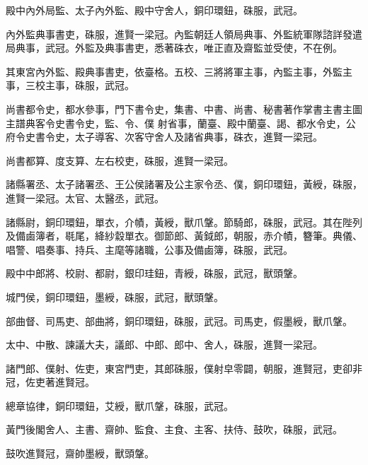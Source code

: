 \begin{pinyinscope}
 殿中內外局監、太子內外監、殿中守舍人，銅印環鈕，硃服，武冠。



 內外監典事書吏，硃服，進賢一梁冠。內監朝廷人領局典事、外監統軍隊諮詳發遣局典事，武冠。外監及典事書吏，悉著硃衣，唯正直及齋監並受使，不在例。



 其東宮內外監、殿典事書吏，依臺格。五校、三將將軍主事，內監主事，外監主事，三校主事，硃服，武冠。



 尚書都令史，都水參事，門下書令史，集書、中書、尚書、秘書著作掌書主書主圖主譜典客令史書令史，監、令、僕
 射省事，蘭臺、殿中蘭臺、謁、都水令史，公府令史書令史，太子導客、次客守舍人及諸省典事，硃衣，進賢一梁冠。



 尚書都算、度支算、左右校吏，硃服，進賢一梁冠。



 諸縣署丞、太子諸署丞、王公侯諸署及公主家令丞、僕，銅印環鈕，黃綬，硃服，進賢一梁冠。太官、太醫丞，武冠。



 諸縣尉，銅印環鈕，單衣，介幘，黃綬，獸爪鞶。節騎郎，硃服，武冠。其在陛列及備鹵簿者，毼尾，絳紗縠單衣。御節郎、黃鉞郎，朝服，赤介幘，簪筆。典儀、唱警、唱奏事、持兵、主麾等諸職，公事及備鹵簿，硃服，武冠。



 殿中中郎將、校尉、都尉，銀印珪鈕，青綬，硃服，武冠，獸頭鞶。



 城門侯，銅印環鈕，墨綬，硃服，武冠，獸頭鞶。



 部曲督、司馬吏、部曲將，銅印環鈕，硃服，武冠。司馬吏，假墨綬，獸爪鞶。



 太中、中散、諫議大夫，議郎、中郎、郎中、舍人，硃服，進賢一梁冠。



 諸門郎、僕射、佐吏，東宮門吏，其郎硃服，僕射皁零闢，朝服，進賢冠，吏卻非冠，佐吏著進賢冠。



 總章協律，銅印環鈕，艾綬，獸爪鞶，硃服，武冠。



 黃門後閣舍人、主書、齋帥、監食、主食、主客、扶侍、鼓吹，硃服，武冠。



 鼓吹進賢冠，齋帥墨綬，獸頭鞶。




\end{pinyinscope}
